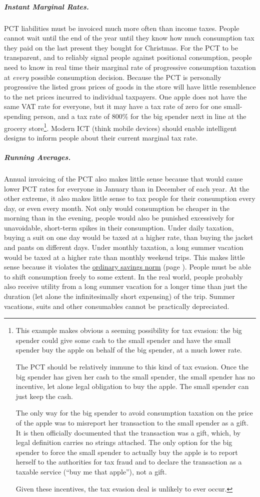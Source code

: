 \subparagraph{Instant Marginal Rates.} PCT liabilities must be invoiced much more often than income taxes. People cannot wait until the end of the year until they know how much consumption tax they paid on the last present they bought for Christmas. For the PCT to be transparent, and to reliably signal people against positional consumption, people need to know in real time their marginal rate of progressive consumption taxation at \emph{every} possible consumption decision. Because the PCT is personally progressive the listed gross prices of goods in the store will have little resemblence to the net prices incurred to individual taxpayers. One apple does not have the same VAT rate for everyone, but it may have a tax rate of zero for one small-spending person, and a tax rate of 800\% for the big spender next in line at the grocery store\footnote{
	This example makes obvious a seeming possibility for tax evasion: the big spender could give some cash to the small spender and have the small spender buy the apple on behalf of the big spender, at a much lower rate.

	The PCT should be relatively immune to this kind of tax evasion. Once the big spender has given her cash to the small spender, the small spender has no incentive, let alone legal obligation to buy the apple. The small spender can just keep the cash.

	The only way for the big spender to avoid consumption taxation on the price of the apple was to misreport her transaction to the small spender as a gift. It is then officially documented that the transaction was a gift, which, by legal definition carries no strings attached. The only option for the big spender to force the small spender to actually buy the apple is to report herself to the authorities for tax fraud and to declare the transaction as a taxable service (``buy me that apple''), not a gift.

	Given these incentives, the tax evasion deal is unlikely to ever occur.}.
Modern ICT (think mobile devices) should enable intelligent designs to inform people about their current marginal tax rate.

\subparagraph{Running Averages.} Annual invoicing of the PCT also makes little sense because that would cause lower PCT rates for everyone in January than in December of each year. At the other extreme, it also makes little sense to tax people for their consumption every day, or even every month. Not only would consumption be cheaper in the morning than in the evening, people would also be punished excessively for unavoidable, short-term spikes in their consumption. Under daily taxation, buying a suit on one day would be taxed at a higher rate, than buying the jacket and pants on different days. Under monthly taxation, a long summer vacation would be taxed at a higher rate than monthly weekend trips. This makes little sense because it violates the \hyperref[sec:OSN]{ordinary savings norm} (page \pageref{sec:OSN}). People must be able to shift consumption freely to some extent. In the real world, people probably also receive utility from a long summer vacation for a longer time than just the duration (let alone the infinitesimally short expensing) of the trip. Summer vacations, suits and other consumables cannot be practically depreciated.

